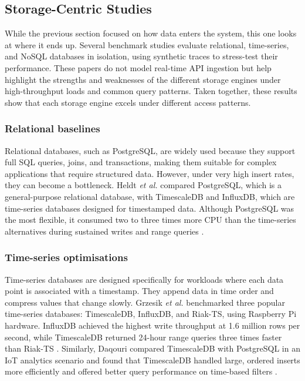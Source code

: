 \documentclass[nomenclature, english, biblatex]{kththesis}
\numberwithin{listing}{chapter}
\begin{document}
\subsection{Storage-Centric Studies}
While the previous section focused on how data enters the system, this one looks at where it ends up. Several benchmark studies evaluate relational, time-series, and NoSQL databases in isolation, using synthetic traces to stress-test their performance. These papers do not model real-time API ingestion but help highlight the strengths and weaknesses of the different storage engines under high-throughput loads and common query patterns. Taken together, these results show that each storage engine excels under different access patterns.

\subsubsection{Relational baselines}
Relational databases, such as PostgreSQL, are widely used because they support full SQL queries, joins, and transactions, making them suitable for complex applications that require structured data.
However, under very high insert rates, they can become a bottleneck. Heldt \textit{et al.} compared PostgreSQL, which is a general-purpose relational database, with TimescaleDB and InfluxDB, which are time-series databases designed for timestamped data.
Although PostgreSQL was the most flexible, it consumed two to three times more CPU than the time-series alternatives during sustained writes and range queries \cite{Heldt2021SciTS}.

\subsubsection{Time-series optimisations}
Time-series databases are designed specifically for workloads where each data point is associated with a timestamp. They append data in time order and compress values that change slowly.
Grzesik \textit{et al.} benchmarked three popular time-series databases: TimescaleDB, InfluxDB, and Riak-TS, using Raspberry Pi hardware. InfluxDB achieved the highest write throughput at 1.6 million rows per second, while TimescaleDB returned 24-hour range queries three times faster than Riak-TS \cite{Grzesik2020EdgeIoTBenchmark}.
Similarly, Daqouri compared TimescaleDB with PostgreSQL in an \gls{IoT} analytics scenario and found that TimescaleDB handled large, ordered inserts more efficiently and offered better query performance on time-based filters \cite{Daqouri2023TimeseriesVsSQL}.
\end{document}
